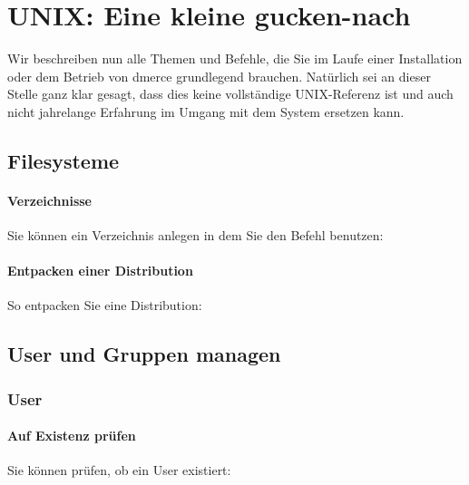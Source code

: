 \section{UNIX: Eine kleine gucken-nach}
\label{UNIX}

Wir beschreiben nun alle Themen und Befehle, die Sie im Laufe einer
Installation oder dem Betrieb von dmerce grundlegend brauchen.
Nat\"urlich sei an dieser Stelle ganz klar gesagt, dass dies keine
vollst\"andige UNIX-Referenz ist und auch nicht jahrelange Erfahrung
im Umgang mit dem System ersetzen kann.

\subsection{Filesysteme}

\paragraph{Verzeichnisse}

Sie k\"onnen ein Verzeichnis anlegen in dem Sie den Befehl 
benutzen:


\paragraph{Entpacken einer Distribution}

So entpacken Sie eine Distribution:

\subsection{User und Gruppen managen}

\subsubsection{User}

\paragraph{Auf Existenz pr\"ufen}

Sie k\"onnen pr\"ufen, ob ein User existiert:

